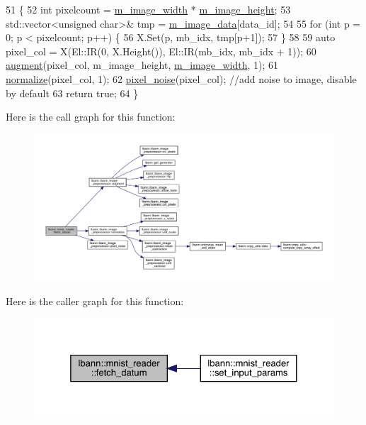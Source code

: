 \begin{DoxyCode}
51                                                                        \{
52   \textcolor{keywordtype}{int} pixelcount = \hyperlink{classlbann_1_1image__data__reader_af001f3d1c0f1c580b66988233b3a64f0}{m\_image\_width} * \hyperlink{classlbann_1_1image__data__reader_a0632efa3deaa9d61e671f741909eb3fe}{m\_image\_height};
53   std::vector<unsigned char>& tmp = \hyperlink{classlbann_1_1mnist__reader_a566ec18b29037abafe472b371f86aaca}{m\_image\_data}[data\_id];
54   
55   \textcolor{keywordflow}{for} (\textcolor{keywordtype}{int} p = 0; p < pixelcount; p++) \{
56     X.Set(p, mb\_idx, tmp[p+1]);
57   \}
58 
59   \textcolor{keyword}{auto} pixel\_col = X(El::IR(0, X.Height()), El::IR(mb\_idx, mb\_idx + 1));
60   \hyperlink{classlbann_1_1lbann__image__preprocessor_a27cb5182c4f764cbfa4edecbb78ef29d}{augment}(pixel\_col, m\_image\_height, \hyperlink{classlbann_1_1image__data__reader_af001f3d1c0f1c580b66988233b3a64f0}{m\_image\_width}, 1);
61   \hyperlink{classlbann_1_1lbann__image__preprocessor_ae370cdc9f776ce8cce94a45cacf47425}{normalize}(pixel\_col, 1);
62   \hyperlink{classlbann_1_1lbann__image__preprocessor_aece5b572d0a2fe123cc66412d7a5c91e}{pixel\_noise}(pixel\_col); \textcolor{comment}{//add noise to image, disable by default}
63   \textcolor{keywordflow}{return} \textcolor{keyword}{true};
64 \}
\end{DoxyCode}
Here is the call graph for this function\+:\nopagebreak
\begin{figure}[H]
\begin{center}
\leavevmode
\includegraphics[width=350pt]{classlbann_1_1mnist__reader_af257b58b61ae9f3f623f1cb5d18c4841_cgraph}
\end{center}
\end{figure}
Here is the caller graph for this function\+:\nopagebreak
\begin{figure}[H]
\begin{center}
\leavevmode
\includegraphics[width=325pt]{classlbann_1_1mnist__reader_af257b58b61ae9f3f623f1cb5d18c4841_icgraph}
\end{center}
\end{figure}
